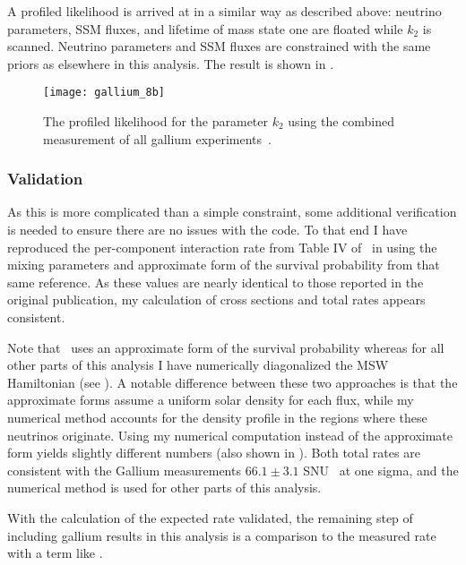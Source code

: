A profiled likelihood is arrived at in a similar way as described above: neutrino parameters, SSM fluxes, and lifetime of mass state one are floated while $k_2$ is scanned. 
Neutrino parameters and SSM fluxes are constrained with the same priors as elsewhere in this analysis.
The result is shown in .

\begin{figure}
\centering
\texttt{[image: gallium\_8b]}
\caption{The profiled likelihood for the parameter $k_2$ using the combined measurement of all gallium experiments~\cite{sagecombo}.}
\label{fig:ga_profiles}
\end{figure}

\subsubsection{Validation}

As this is more complicated than a simple constraint, some additional verification is needed to ensure there are no issues with the code.
To that end I have reproduced the per-component interaction rate from Table IV of~\cite{sagecombo} in  using the mixing parameters and approximate form of the survival probability from that same reference.
As these values are nearly identical to those reported in the original publication, my calculation of cross sections and total rates appears consistent.

Note that~\cite{sagecombo} uses an approximate form of the survival probability whereas for all other parts of this analysis I have numerically diagonalized the MSW Hamiltonian (see ).
A notable difference between these two approaches is that the approximate forms assume a uniform solar density for each flux, while my numerical method accounts for the density profile in the regions where these neutrinos originate.
Using my numerical computation instead of the approximate form yields slightly different numbers (also shown in ). 
Both total rates are consistent with the Gallium measurements $66.1\pm3.1$ SNU~\cite{sagecombo} at one sigma, and the numerical method is used for other parts of this analysis.

With the calculation of the expected rate validated, the remaining step of including gallium results in this analysis is a comparison to the measured rate with a term like .

